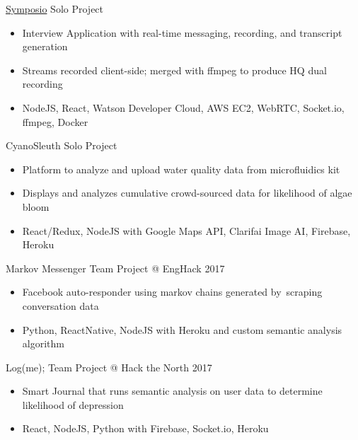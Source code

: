 \documentclass[]{friggeri-cv}
\begin{document}
\begin{entrylist}
	\entry
	{\href{https://symposio.stream}{Symposio\textsuperscript{\faExternalLink}}  \href{https://github.com/suzyng83209/symposio}{\textcolor{red}{\faGithub}}}
	{\vspace{0.5\parsep}Solo Project}
	{
		\begin{itemize}[leftmargin=*]\itemsep0.1cm
			\vspace{-0.4cm}
			\item Interview Application with {real-time messaging}, recording, and transcript generation \ 
			\item Streams recorded client-side; {merged with ffmpeg} to produce HQ dual recording
			\item NodeJS, React, Watson Developer Cloud, AWS EC2, WebRTC, Socket.io, ffmpeg, Docker
		\end{itemize}
	}
	\entry
	{CyanoSleuth \href{https://github.com/suzyng83209/cyanosleuth}{\textcolor{red}{\faGithub}}}
	{\vspace{0.5\parsep}Solo Project}
	{
		\begin{itemize}[leftmargin=*]\itemsep0.1cm
			\vspace{-0.4cm}
			\item {Platform to analyze and upload} water quality data from microfluidics kit
			\item Displays and analyzes cumulative crowd-sourced data for likelihood of algae bloom
			\item React/Redux, NodeJS with Google Maps API, Clarifai Image AI, Firebase, Heroku
		\end{itemize}
	}
	\entry
	{Markov Messenger  \href{https://github.com/suzyng83209/markov-messenger-bot}{\textcolor{red}{\faGithub}}}
	{\vspace{0.5\parsep}Team Project @ EngHack 2017}
	{
		\begin{itemize}[leftmargin=*]\itemsep0.1cm
			\vspace{-0.4cm}
			\item Facebook auto-responder using {markov chains} generated by\ {scraping conversation data}
			\item Python, ReactNative, NodeJS with Heroku and custom semantic analysis algorithm
		\end{itemize}
	}
	\entry
	{Log(me);  \href{https://github.com/suzyng83209/htn2017}{\textcolor{red}{\faGithub}}}
	{\vspace{0.5\parsep}Team Project @ Hack the North 2017}
	{
		\begin{itemize}[leftmargin=*]\itemsep0.1cm
			\vspace{-0.4cm}
			\item Smart Journal that runs {semantic analysis on user data} to determine likelihood of depression
			\item React, NodeJS, Python with Firebase, Socket.io, Heroku
		\end{itemize}
	}
\end{entrylist}
\end{document}
